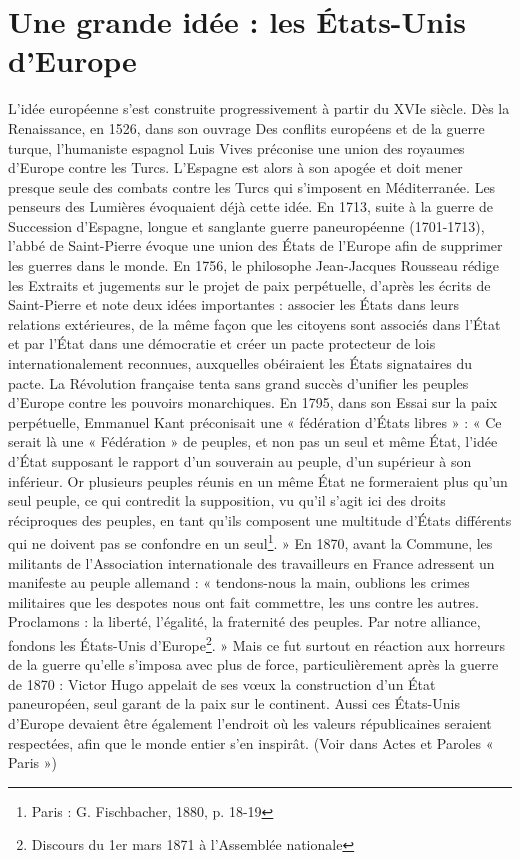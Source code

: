 \documentclass{report}%
\begin{document}
\section{Une grande idée : les États-Unis d'Europe}
L'idée européenne s'est construite progressivement à partir du XVIe siècle. Dès la Renaissance, en 1526, dans son ouvrage Des conflits européens et de la guerre turque, l’humaniste espagnol Luis Vives préconise une union des royaumes d’Europe contre les Turcs. L’Espagne est alors à son apogée et doit mener presque seule des combats contre les Turcs qui s’imposent en Méditerranée.
Les penseurs des Lumières évoquaient déjà cette idée. En 1713, suite à la guerre de Succession d’Espagne, longue et sanglante guerre paneuropéenne (1701-1713), l’abbé de Saint-Pierre évoque une union des États de l’Europe afin de supprimer les guerres dans le monde. En 1756, le philosophe Jean-Jacques Rousseau rédige les Extraits et jugements sur le projet de paix perpétuelle, d’après les écrits de Saint-Pierre et note deux idées importantes : associer les États dans leurs relations extérieures, de la même façon que les citoyens sont associés dans l’État et par l’État dans une démocratie et créer un pacte protecteur de lois internationalement reconnues, auxquelles obéiraient les États signataires du pacte.
La Révolution française tenta sans grand succès d'unifier les peuples d’Europe contre les pouvoirs monarchiques. En 1795, dans son Essai sur la paix perpétuelle, Emmanuel Kant préconisait une « fédération d'États libres » :
« Ce serait là une « Fédération » de peuples, et non pas un seul et même État, l'idée d'État supposant le rapport d'un souverain au peuple, d'un supérieur à son inférieur. Or plusieurs peuples réunis en un même État ne formeraient plus qu'un seul peuple, ce qui contredit la supposition, vu qu'il s'agit ici des droits réciproques des peuples, en tant qu'ils composent une multitude d'États différents qui ne doivent pas se confondre en un seul\footnote{Paris : G. Fischbacher, 1880, p. 18-19}. »
En 1870, avant la Commune, les militants de l’Association internationale des travailleurs en France adressent un manifeste au peuple allemand : « tendons-nous la main, oublions les crimes militaires que les despotes nous ont fait commettre, les uns contre les autres. Proclamons : la liberté, l’égalité, la fraternité des peuples. Par notre alliance, fondons les États-Unis d’Europe\footnote{Discours du 1er mars 1871 à l'Assemblée nationale}. »
Mais ce fut surtout en réaction aux horreurs de la guerre qu'elle s'imposa avec plus de force, particulièrement après la guerre de 1870 : Victor Hugo appelait de ses vœux la construction d'un État paneuropéen, seul garant de la paix sur le continent. Aussi ces États-Unis d'Europe devaient être également l'endroit où les valeurs républicaines seraient respectées, afin que le monde entier s'en inspirât. (Voir dans Actes et Paroles « Paris »)
\end{document}
